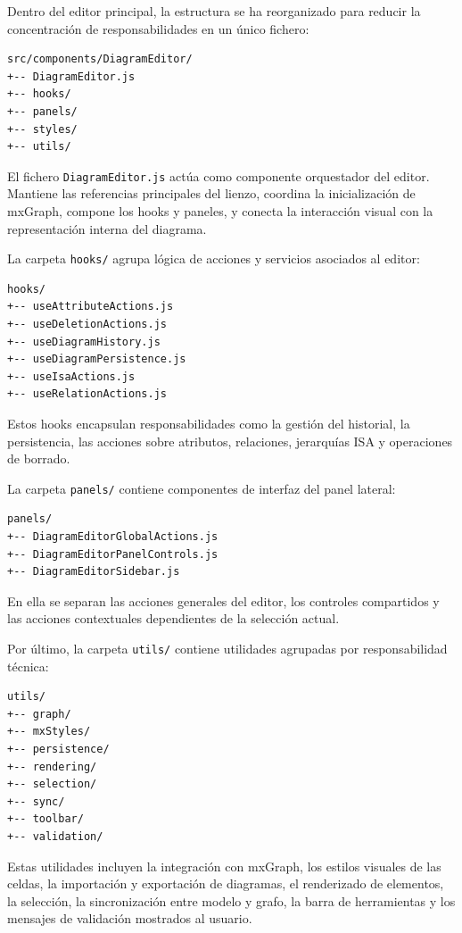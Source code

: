 Dentro del editor principal, la estructura se ha reorganizado para reducir la concentración de responsabilidades en un único fichero:

\begin{verbatim}
src/components/DiagramEditor/
+-- DiagramEditor.js
+-- hooks/
+-- panels/
+-- styles/
+-- utils/
\end{verbatim}

El fichero \texttt{DiagramEditor.js} actúa como componente orquestador del editor. Mantiene las referencias principales del lienzo, coordina la inicialización de mxGraph, compone los hooks y paneles, y conecta la interacción visual con la representación interna del diagrama.

La carpeta \texttt{hooks/} agrupa lógica de acciones y servicios asociados al editor:

\begin{verbatim}
hooks/
+-- useAttributeActions.js
+-- useDeletionActions.js
+-- useDiagramHistory.js
+-- useDiagramPersistence.js
+-- useIsaActions.js
+-- useRelationActions.js
\end{verbatim}

Estos hooks encapsulan responsabilidades como la gestión del historial, la persistencia, las acciones sobre atributos, relaciones, jerarquías ISA y operaciones de borrado.

La carpeta \texttt{panels/} contiene componentes de interfaz del panel lateral:

\begin{verbatim}
panels/
+-- DiagramEditorGlobalActions.js
+-- DiagramEditorPanelControls.js
+-- DiagramEditorSidebar.js
\end{verbatim}

En ella se separan las acciones generales del editor, los controles compartidos y las acciones contextuales dependientes de la selección actual.

Por último, la carpeta \texttt{utils/} contiene utilidades agrupadas por responsabilidad técnica:

\begin{verbatim}
utils/
+-- graph/
+-- mxStyles/
+-- persistence/
+-- rendering/
+-- selection/
+-- sync/
+-- toolbar/
+-- validation/
\end{verbatim}

Estas utilidades incluyen la integración con mxGraph, los estilos visuales de las celdas, la importación y exportación de diagramas, el renderizado de elementos, la selección, la sincronización entre modelo y grafo, la barra de herramientas y los mensajes de validación mostrados al usuario.

